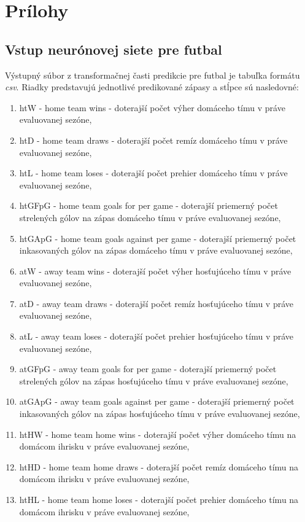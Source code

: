 \chapter{Prílohy}

\section{Vstup neurónovej siete pre futbal} \label{in:foot}
Výstupný súbor z transformačnej časti predikcie pre futbal je tabuľka formátu \textit{csv}. Riadky predstavujú jednotlivé predikované zápasy a stĺpce sú nasledovné:
\begin{enumerate}
 \item htW - home team wins - doterajší počet výher domáceho tímu v práve evaluovanej sezóne,
 \item htD - home team draws - doterajší počet remíz domáceho tímu v práve evaluovanej sezóne,
 \item htL - home team loses - doterajší počet prehier domáceho tímu v práve evaluovanej sezóne,
 \item htGFpG - home team goals for per game - doterajší priemerný počet strelených gólov na zápas domáceho tímu v práve evaluovanej sezóne,
 \item htGApG - home team goals against per game - doterajší priemerný počet inkasovaných gólov na zápas domáceho tímu v práve evaluovanej sezóne,
 \item atW - away team wins - doterajší počet výher hosťujúceho tímu v práve evaluovanej sezóne,
 \item atD - away team draws - doterajší počet remíz hosťujúceho tímu v práve evaluovanej sezóne,
 \item atL - away team loses - doterajší počet prehier hosťujúceho tímu v práve evaluovanej sezóne,
 \item atGFpG - away team goals for per game - doterajší priemerný počet strelených gólov na zápas hosťujúceho tímu v práve evaluovanej sezóne,
 \item atGApG - away team goals against per game - doterajší priemerný počet inkasovaných gólov na zápas hosťujúceho tímu v práve evaluovanej sezóne,
 \item htHW - home team home wins - doterajší počet výher domáceho tímu na domácom ihrisku v práve evaluovanej sezóne,
 \item htHD - home team home draws - doterajší počet remíz domáceho tímu na domácom ihrisku v práve evaluovanej sezóne,
 \item htHL - home team home loses - doterajší počet prehier domáceho tímu na domácom ihrisku v práve evaluovanej sezóne,

\end{enumerate}
